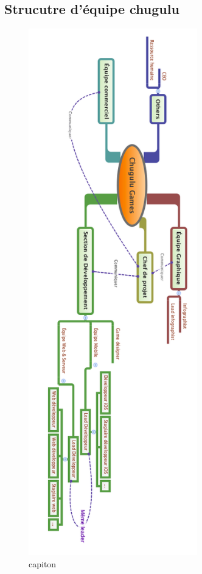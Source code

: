 
\subsection{Strucutre d'équipe chugulu} %
\label{sub:strucutre_d_équipe_chugulu}


\begin{figure}[htbp]
	\centering
		\includegraphics[height=9in]{XMinds/EquipeChuguluGames.png}
	\caption{capiton}
	\label{fig:XMinds_EquipeChuguluGames}
\end{figure}


